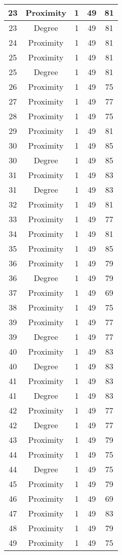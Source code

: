 \documentclass[results.tex]{subfiles}
\begin{document}
\begin{center}
\begin{tabular}{| c || c | c | c | c |}
    \hline
    23 & Proximity & 1 & 49 & 81 \\ 
    \hline
    23 & Degree & 1 & 49 & 81 \\ 
    \hline
    24 & Proximity & 1 & 49 & 81 \\ 
    \hline
    25 & Proximity & 1 & 49 & 81 \\ 
    \hline
    25 & Degree & 1 & 49 & 81 \\ 
    \hline
    26 & Proximity & 1 & 49 & 75 \\ 
    \hline
    27 & Proximity & 1 & 49 & 77 \\ 
    \hline
    28 & Proximity & 1 & 49 & 75 \\ 
    \hline
    29 & Proximity & 1 & 49 & 81 \\ 
    \hline
    30 & Proximity & 1 & 49 & 85 \\ 
    \hline
    30 & Degree & 1 & 49 & 85 \\ 
    \hline
    31 & Proximity & 1 & 49 & 83 \\ 
    \hline
    31 & Degree & 1 & 49 & 83 \\ 
    \hline
    32 & Proximity & 1 & 49 & 81 \\ 
    \hline
    33 & Proximity & 1 & 49 & 77 \\ 
    \hline
    34 & Proximity & 1 & 49 & 81 \\ 
    \hline
    35 & Proximity & 1 & 49 & 85 \\ 
    \hline
    36 & Proximity & 1 & 49 & 79 \\ 
    \hline
    36 & Degree & 1 & 49 & 79 \\ 
    \hline
    37 & Proximity & 1 & 49 & 69 \\ 
    \hline
    38 & Proximity & 1 & 49 & 75 \\ 
    \hline
    39 & Proximity & 1 & 49 & 77 \\ 
    \hline
    39 & Degree & 1 & 49 & 77 \\ 
    \hline
    40 & Proximity & 1 & 49 & 83 \\ 
    \hline
    40 & Degree & 1 & 49 & 83 \\ 
    \hline
    41 & Proximity & 1 & 49 & 83 \\ 
    \hline
    41 & Degree & 1 & 49 & 83 \\ 
    \hline
    42 & Proximity & 1 & 49 & 77 \\ 
    \hline
    42 & Degree & 1 & 49 & 77 \\ 
    \hline
    43 & Proximity & 1 & 49 & 79 \\ 
    \hline
    44 & Proximity & 1 & 49 & 75 \\ 
    \hline
    44 & Degree & 1 & 49 & 75 \\ 
    \hline
    45 & Proximity & 1 & 49 & 79 \\ 
    \hline
    46 & Proximity & 1 & 49 & 69 \\ 
    \hline
    47 & Proximity & 1 & 49 & 83 \\ 
    \hline
    48 & Proximity & 1 & 49 & 79 \\ 
    \hline
    49 & Proximity & 1 & 49 & 75 \\ 
    \hline   \end{tabular}
\end{center}
\end{document}
